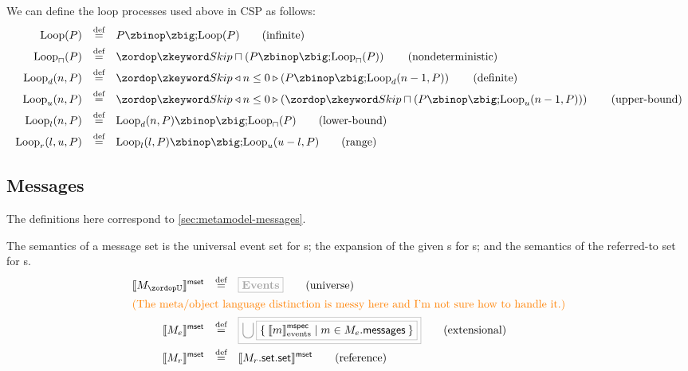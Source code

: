 \begin{defn}

We can define the loop processes used above in CSP as follows:
%
\begin{align*}
  \iloop{P}
  \quad\defeq\quad
  & P \circseq \iloop{P}
    \tag{infinite}
  \\
  \nloop{P}
  \quad\defeq\quad
  & \Skip \sqcap \left(P \circseq \nloop{P}\right)
    \tag{nondeterministic}
  \\  
  \dloop{n}{P}
  \quad\defeq\quad
  & \Skip \triangleleft n \leq 0 \triangleright \left(P \circseq \dloop{n-1}{P}\right)
    \tag{definite}
  \\
  \uloop{n}{P}
  \quad\defeq\quad
  & \Skip \triangleleft n \leq 0 \triangleright \left(\Skip \sqcap \left(P \circseq \uloop{n-1}{P}\right)\right)
    \tag{upper-bound}
  \\
  \lloop{n}{P}
  \quad\defeq\quad
  & \dloop{n}{P} \circseq \nloop{P}
    \tag{lower-bound}
  \\
  \rloop{l}{u}{P}
  \quad\defeq\quad
  & \lloop{l}{P} \circseq \uloop{u - l}{P}
    \tag{range}
  \\
\end{align*}
\end{defn}

\subsection{Messages}\label{ssec:semantics-tockcsp-messages}

The definitions here correspond to \cref{sec:metamodel-messages}.

\begin{defn}[\mmessageset]

  The semantics of a message set is the universal event set for \muniversemessageset s;
  the expansion of the given \mgapmessagespec s for \mextensionalmessageset s;
  and the semantics of the referred-to set for \mrefmessageset s.
%
\begin{align*}
  \msgsetsema{\aumsgset}
  \quad\defeq\quad
  &
    \tlang{\events}
    \tag{universe}
  \\
  \intertext{\todo{The meta/object language distinction is messy here
  and I'm not sure how to handle it.}}
  \msgsetsema{\anemsgset}
  \quad\defeq\quad
  &
    \tlang{
    \bigcup
    \olang{
    \Set{
    \emspecsema{\amspec} | \amspec \in \field{\anemsgset}{messages}
    }
    }
    }
    \tag{extensional}
  \\
  \msgsetsema{\armsgset}
  \quad\defeq\quad
  &
    \msgsetsema{\field{\field{\armsgset}{set}}{set}}
    \tag{reference}
\end{align*}
\end{defn}

